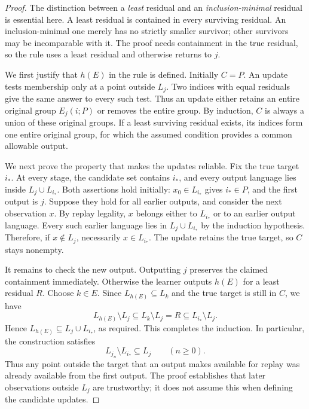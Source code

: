 \begin{proof}
The distinction between a \emph{least} residual and an
\emph{inclusion-minimal} residual is essential here. A least residual
is contained in every surviving residual. An inclusion-minimal one
merely has no strictly smaller survivor; other survivors may be
incomparable with it. The proof needs containment in the true
residual, so the rule uses a least residual and otherwise returns
to $j$.

We first justify that $h(E)$ in the rule is defined. Initially $C=P$.
An update tests membership only at a point outside $L_j$. Two indices
with equal residuals give the same answer to every such test. Thus
an update either retains an entire original group $E_j(i;P)$ or
removes the entire group. By induction, $C$ is always a union of
these original groups. If a least surviving residual exists, its
indices form one entire original group, for which the assumed
condition provides a common allowable output.

We next prove the property that makes the updates reliable. Fix the
true target $i_*$. At every stage, the candidate set contains $i_*$,
and every output language lies inside $L_j\cup L_{i_*}$. Both
assertions hold initially: $x_0\in L_{i_*}$ gives $i_*\in P$, and
the first output is $j$. Suppose they hold for all earlier outputs,
and consider the next observation $x$. By replay legality, $x$
belongs either to $L_{i_*}$ or to an earlier output language. Every
such earlier language lies in $L_j\cup L_{i_*}$ by the induction
hypothesis. Therefore, if $x\notin L_j$, necessarily
$x\in L_{i_*}$. The update retains the true target, so $C$ stays
nonempty.

It remains to check the new output. Outputting $j$ preserves the
claimed containment immediately. Otherwise the learner outputs
$h(E)$ for a least residual $R$. Choose $k\in E$. Since
$L_{h(E)}\subseteq L_k$ and the true target is still in $C$, we have
\[
 L_{h(E)}\setminus L_j
 \subseteq L_k\setminus L_j
 =R
 \subseteq L_{i_*}\setminus L_j.
\]
Hence $L_{h(E)}\subseteq L_j\cup L_{i_*}$, as required. This
completes the induction. In particular, the construction satisfies
\begin{equation}
 L_{j_n}\setminus L_{i_*}\subseteq L_j
       \qquad(n\ge0).\label{app:replay:eq:contain}
\end{equation}
Thus any point outside the target that an output makes available for
replay was already available from the first output. The proof
establishes that later observations outside $L_j$ are trustworthy;
it does not assume this when defining the candidate updates.


\end{proof}
